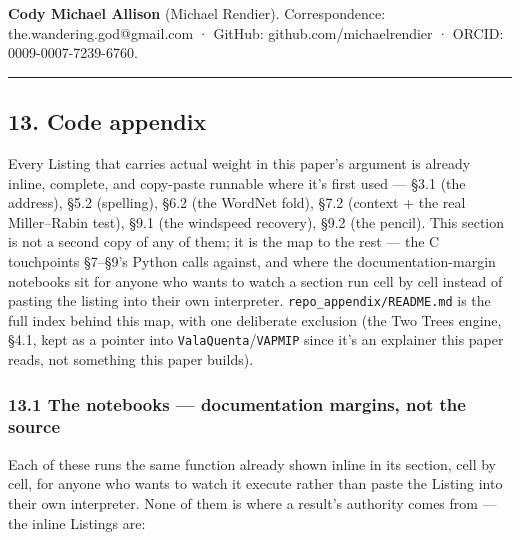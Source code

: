 \documentclass[
  10pt,
]{article}
\begin{document}
\textbf{Cody Michael Allison} (Michael Rendier). Correspondence:
the.wandering.god@gmail.com · GitHub: github.com/michaelrendier · ORCID:
0009-0007-7239-6760.

\begin{center}\rule{0.5\linewidth}{0.5pt}\end{center}

\hypertarget{code-appendix}{%
\subsection{13. Code appendix}\label{code-appendix}}

Every Listing that carries actual weight in this paper's argument is
already inline, complete, and copy-paste runnable where it's first used
--- §3.1 (the address), §5.2 (spelling), §6.2 (the WordNet fold), §7.2
(context + the real Miller--Rabin test), §9.1 (the windspeed recovery),
§9.2 (the pencil). This section is not a second copy of any of them; it
is the map to the rest --- the C touchpoints §7--§9's Python calls
against, and where the documentation-margin notebooks sit for anyone who
wants to watch a section run cell by cell instead of pasting the listing
into their own interpreter. \texttt{repo\_appendix/README.md} is the
full index behind this map, with one deliberate exclusion (the Two Trees
engine, §4.1, kept as a pointer into \texttt{ValaQuenta}/\texttt{VAPMIP}
since it's an explainer this paper reads, not something this paper
builds).

\hypertarget{the-notebooks-documentation-margins-not-the-source}{%
\subsubsection{13.1 The notebooks --- documentation margins, not the
source}\label{the-notebooks-documentation-margins-not-the-source}}

Each of these runs the same function already shown inline in its
section, cell by cell, for anyone who wants to watch it execute rather
than paste the Listing into their own interpreter. None of them is where
a result's authority comes from --- the inline Listings are:
\end{document}
